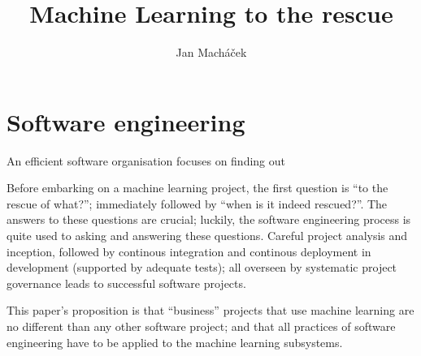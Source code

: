 



\title{Machine Learning to the rescue}

\author{Jan Macháček}




\section{Software engineering}
An efficient software organisation focuses on finding out

Before embarking on a machine learning project, the first question is ``to the rescue of what?''; immediately followed by ``when is it indeed rescued?''. The answers to these questions are crucial; luckily, the software engineering process is quite used to asking and answering these questions. Careful project analysis and inception, followed by continous integration and continous deployment in development (supported by adequate tests); all overseen by systematic project governance leads to successful software projects. 

This paper's proposition is that ``business'' projects that use machine learning are no different than any other software project; and that all practices of software engineering have to be applied to the machine learning subsystems.

